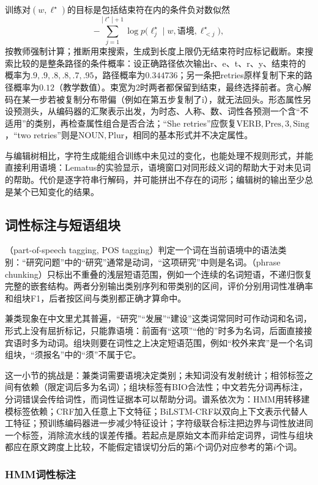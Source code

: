 训练对$(w,\ell^\star)$的目标是包括结束符在内的条件负对数似然
\[
  -\sum_{j=1}^{|\ell^\star|+1}\log p\bigl(\ell_j^\star\mid w,\text{语境},\ell^\star_{<j}\bigr),
\]
按教师强制计算；推断用束搜索，生成到长度上限仍无结束符时应标记截断。束搜索比较的是整条路径的条件概率：设正确路径依次输出r、e、t、r、y、结束符的概率为$.9,.9,.8,.8,.7,.95$，路径概率为$0.344736$；另一条把retries原样复制下来的路径概率为$0.12$（教学数值）。束宽为2时两者都保留到结束，最终选择前者。贪心解码在某一步若被复制分布带偏（例如在第五步复制了i），就无法回头。形态属性另设预测头，从编码器的汇聚表示出发，为时态、人称、数、词性各预测一个含“不适用”的类别，再检查属性组合是否合法；“She retries”应恢复$\mathrm{VERB,Pres,3,Sing}$，“two retries”则是$\mathrm{NOUN,Plur}$，相同的基本形式并不决定属性。

与编辑树相比，字符生成能组合训练中未见过的变化，也能处理不规则形式，并能直接利用语境：Lematus的实验显示，语境窗口对同形歧义词的帮助大于对未见词的帮助。代价是逐字符串行解码，并可能拼出不存在的词形；编辑树的输出至少总是某个已知变化的结果。

\subsection{词性标注与短语组块}
\label{sec:nlp-analysis-pos-chunk}

（part-of-speech tagging, POS tagging）判定一个词在当前语境中的语法类别：“研究问题”中的“研究”通常是动词，“这项研究”中则是名词。（phrase chunking）只标出不重叠的浅层短语范围，例如一个连续的名词短语，不递归恢复完整的嵌套结构。两者分别输出类别序列和带类别的区间，评价分别用词性准确率和组块F1，后者按区间与类别都正确才算命中。

兼类现象在中文里尤其普遍，“研究”“发展”“建设”这类词常同时可作动词和名词，形式上没有屈折标记，只能靠语境：前面有“这项”“他的”时多为名词，后面直接接宾语时多为动词。组块则要在词性之上决定短语范围，例如“校外来宾”是一个名词组块，“须报名”中的“须”不属于它。

这一小节的挑战是：兼类词需要语境决定类别；未知词没有发射统计；相邻标签之间有依赖（限定词后多为名词）；组块标签有BIO合法性；中文若先分词再标注，分词错误会传给词性，而词性证据本可以帮助分词。谱系依次为：HMM用转移建模标签依赖；CRF加入任意上下文特征；BiLSTM-CRF以双向上下文表示代替人工特征；预训练编码器进一步减少特征设计；字符级联合标注把边界与词性放进同一个标签，消除流水线的误差传播。若起点是原始文本而非给定词界，词性与组块都应在原文跨度上比较，不能假定错误切分后的第$i$个词仍对应参考的第$i$个词。

\subsubsection{HMM词性标注}
\label{sec:nlp-analysis-hmm-pos}

